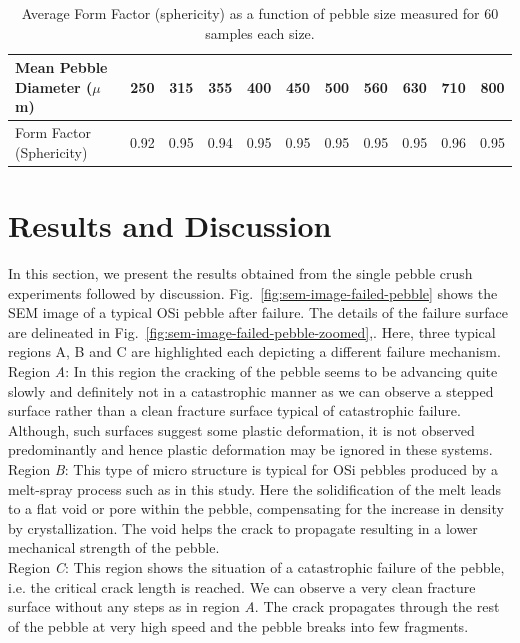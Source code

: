 \begin{table}
	\caption{Average Form Factor (sphericity) as a function of pebble size measured for 60 samples each size.}
	\label{table:sphericity}
	\begin{center}
	\begin{tabular}{lcccccccccc}\toprule
	Mean Pebble Diameter ($\mu$m) & 250 & 315 & 355 & 400 &450 &500 &560 &630 & 710 & 800\\ 
	\hline
	Form Factor (Sphericity) & 0.92 & 0.95 & 0.94 & 0.95 & 0.95 & 0.95 & 0.95 & 0.95 & 0.96 & 0.95\\
	\toprule
	\end{tabular}
\end{center}
\end{table}
\section{Results and Discussion}\label{sec:results}
In this section, we present the results obtained from the single pebble crush experiments followed by discussion. Fig.~\ref{fig:sem-image-failed-pebble} shows the SEM image of a typical OSi pebble after failure. The details of the failure surface are delineated in Fig.~\ref{fig:sem-image-failed-pebble-zoomed},. Here, three typical regions A, B and C are highlighted each depicting a different failure mechanism.\\
Region {\it{A}}: In this region the cracking of the pebble seems to be advancing quite slowly and definitely not in a catastrophic manner as we can observe a stepped surface  rather than a clean fracture surface typical of catastrophic failure. Although, such surfaces suggest some plastic deformation, it is not observed predominantly and hence plastic deformation may be ignored in these systems.\\
Region {\it{B}}: This type of micro structure is typical for OSi pebbles produced by a melt-spray process such as in this study.\citep{Knitter2007a,Kolb2011} Here the solidification of the melt leads to a flat void or pore within the pebble, compensating for the increase in density by crystallization. The void helps the crack to propagate resulting in a lower mechanical strength of the pebble.\\
Region {\it{C}}: This region shows the situation of a catastrophic failure of the pebble, i.e. the critical crack length is reached. We can observe a very clean fracture surface  without any steps as in region {\it{A}}. The crack propagates through the rest of the pebble at very high speed and the pebble breaks into few fragments.\\
